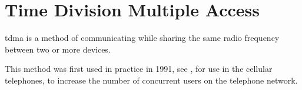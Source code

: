 \chapter{Time Division Multiple Access}\label{TDMA}





\gls{tdma} is a method of communicating while sharing the same radio frequency between two or more devices.

This method was first used in practice in 1991, see \cite{networkencyclopedia2013time}, for use in the cellular telephones, to increase the number of concurrent users on the telephone network.


